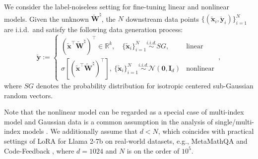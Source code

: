 \begin{assumption}\label{assum:data}
    We consider the label-noiseless setting for fine-tuning  linear and nonlinear models. Given the unknown $\widetilde{\bm W}^\natural$, the $N$ downstream data points $\{ (\widetilde{\bm x}_i,\widetilde{\bm y}_i) \}_{i=1}^N$  are i.i.d.\ and satisfy the following data generation process:
       \[
\widetilde{\bm y} := 
\begin{cases}
(\widetilde{\bm x} ^{\!\top}\widetilde{\bm W}^\natural )^{\!\top} \in \mathbb{R}^k, \quad  \{ \widetilde{\bm x}_i\}_{i=1}^N \overset{i.i.d.}{\sim} SG, & \text{linear} \\ 
\sigma[(\widetilde{\bm x} ^{\!\top}\widetilde{\bm W}^\natural )^{\!\top}] ,~ \{ \widetilde{\bm x}_i\}_{i=1}^N \overset{i.i.d.}{\sim} \mathcal{N}(\bm 0, \bm I_d) & \text{nonlinear}
\end{cases}\,,
\]
where $SG$ denotes the probability distribution for isotropic centered sub-Gaussian random vectors.
\end{assumption}
Note that the nonlinear model can be regarded as a special case of multi-index model \citep{damian2022neural,abbe2022merged,bietti2023learning} and 
Gaussian data is a common assumption in the analysis of single/multi-index models \citep{damian2022neural,lee2024neural,oko2024pretrained}.
We additionally assume that $d < N$, which coincides with practical settings of LoRA for Llama 2-7b \citep{touvron2023llama} on real-world datasets, e.g., MetaMathQA \citep{yu2023metamath} and Code-Feedback \citep{zheng2024opencodeinterpreter}, where $d=1024$ and $N$ is on the order of $10^5$.


